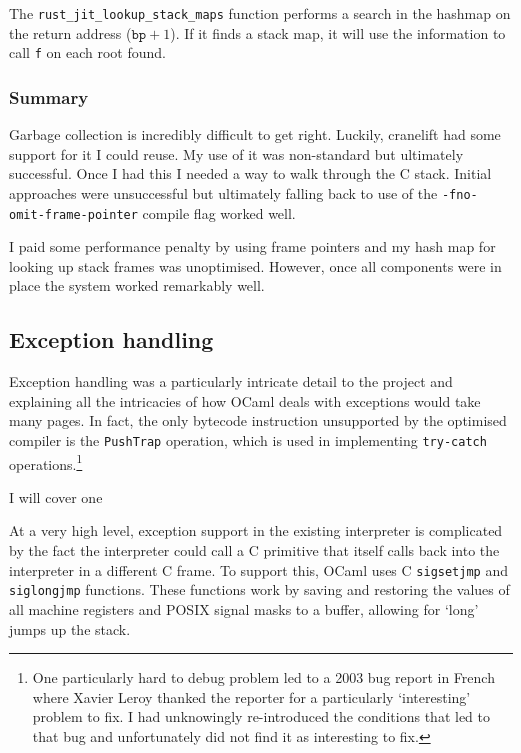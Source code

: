 The \texttt{rust\_jit\_lookup\_stack\_maps} function performs a search in the hashmap on the return
address
($\texttt{bp} + 1$). If it finds a stack map, it will use the information to call \texttt{f} on
each root found.

\subsubsection{Summary}

Garbage collection is incredibly difficult to get right. Luckily, cranelift had some support for it
I could reuse. My use of it was non-standard but ultimately successful. Once I had this I needed a
way to walk through the C stack. Initial approaches were unsuccessful but ultimately falling back
to use of the \texttt{-fno-omit-frame-pointer} compile flag worked well.

I paid some performance penalty by using frame pointers and my hash map for looking up stack frames
was unoptimised. However, once all components were in place the system worked remarkably well.

\subsection{Exception handling}

Exception handling was a particularly intricate detail to the project and explaining all the
intricacies of how OCaml deals with exceptions would take many pages. In fact, the only bytecode
instruction unsupported by the optimised compiler is the \texttt{PushTrap} operation, which is used
in implementing \texttt{try-catch} operations.\footnote{One particularly hard to debug problem led
      to a 2003 bug
      report in French where Xavier Leroy thanked the reporter for a particularly `interesting'
      problem
      to fix. I had unknowingly re-introduced the conditions that led to that bug and unfortunately
      did not find it as interesting to fix.}

I will cover one

At a very high level, exception support in the existing interpreter is complicated by the fact the
interpreter could call a C primitive that itself calls back into the interpreter in a different C
frame. To support this, OCaml uses C \texttt{sigsetjmp} and \texttt{siglongjmp} functions. These
functions work by saving and restoring the values of all machine registers and POSIX signal masks
to a buffer, allowing for `long' jumps up the stack.

